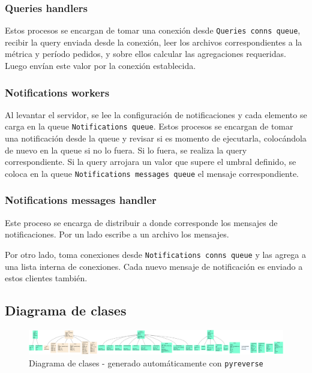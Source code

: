 \documentclass[titlepage,a4paper,oneside]{article}
\begin{document}
\subsubsection{Queries handlers}
Estos procesos se encargan de tomar una conexión desde \texttt{Queries conns queue}, recibir la query enviada desde la conexión, leer los archivos correspondientes a la métrica y período pedidos, y sobre ellos calcular las agregaciones requeridas. Luego envían este valor por la conexión establecida.

\subsubsection{Notifications workers}
Al levantar el servidor, se lee la configuración de notificaciones y cada elemento se carga en la queue \texttt{Notifications queue}. Estos procesos se encargan de tomar una notificación desde la queue y revisar si es momento de ejecutarla, colocándola de nuevo en la queue si no lo fuera. Si lo fuera, se realiza la query correspondiente. Si la query arrojara un valor que supere el umbral definido, se coloca en la queue \texttt{Notifications messages queue} el mensaje correspondiente.

\subsubsection{Notifications messages handler}
Este proceso se encarga de distribuir a donde corresponde los mensajes de notificaciones. Por un lado escribe a un archivo los mensajes.

Por otro lado, toma conexiones desde \texttt{Notifications conns queue} y las agrega a una lista interna de conexiones. Cada nuevo mensaje de notificación es enviado a estos clientes también.

\subsection{Diagrama de clases}
\begin{figure}[H]
\centering
\includegraphics[width=\textwidth]{images/classes.png}
\caption{Diagrama de clases - generado automáticamente con \texttt{pyreverse}}
\end{figure}
\end{document}
